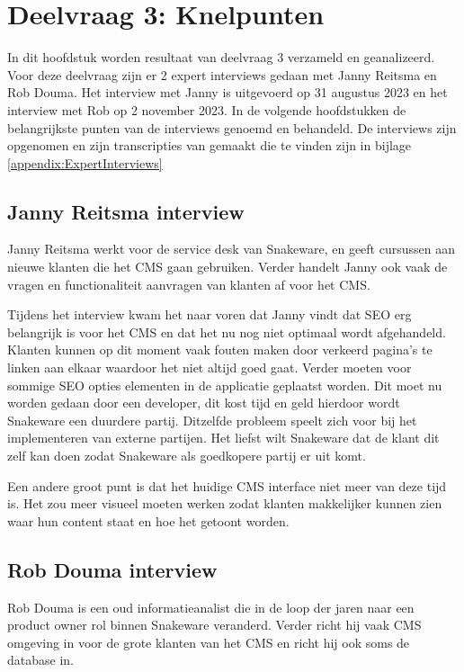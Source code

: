 \section{Deelvraag 3: Knelpunten}
In dit hoofdstuk worden resultaat van deelvraag 3 \textit{\SubquestionThree} verzameld en geanalizeerd.
Voor deze deelvraag zijn er 2 expert interviews gedaan met Janny Reitsma en Rob Douma.
Het interview met Janny is uitgevoerd op 31 augustus 2023 en het interview met Rob op 2 november 2023.
In de volgende hoofdstukken de belangrijkste punten van de interviews genoemd en behandeld.
De interviews zijn opgenomen en zijn transcripties van gemaakt die te vinden zijn in bijlage \ref{appendix:ExpertInterviews}

\subsection{Janny Reitsma interview}
Janny Reitsma werkt voor de service desk van Snakeware, en geeft cursussen aan nieuwe klanten die het CMS gaan gebruiken.
Verder handelt Janny ook vaak de vragen en functionaliteit aanvragen van klanten af voor het CMS.

\whitespace
Tijdens het interview kwam het naar voren dat Janny vindt dat \gls{SEO} erg belangrijk is voor het CMS en dat het nu nog niet optimaal wordt afgehandeld.
Klanten kunnen op dit moment vaak fouten maken door verkeerd pagina's te linken aan elkaar waardoor het niet altijd goed gaat.
Verder moeten voor sommige \gls{SEO} opties elementen in de applicatie geplaatst worden.
Dit moet nu worden gedaan door een developer, dit kost tijd en geld hierdoor wordt Snakeware een duurdere partij.
Ditzelfde probleem speelt zich voor bij het implementeren van externe partijen.
Het liefst wilt Snakeware dat de klant dit zelf kan doen zodat Snakeware als goedkopere partij er uit komt.

\whitespace
Een andere groot punt is dat het huidige CMS interface niet meer van deze tijd is.
Het zou meer visueel moeten werken zodat klanten makkelijker kunnen zien waar hun content staat en hoe het getoont worden.

\subsection{Rob Douma interview}
Rob Douma is een oud informatieanalist die in de loop der jaren naar een product owner rol binnen Snakeware veranderd.
Verder richt hij vaak CMS omgeving in voor de grote klanten van het CMS en richt hij ook soms de database in.

